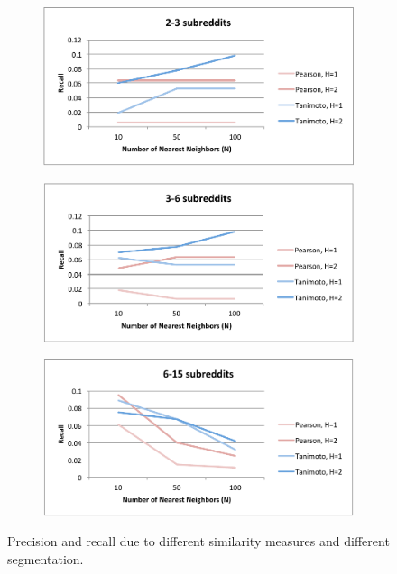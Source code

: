\documentclass{article}
\begin{document}
\begin{figure}[H]
\begin{subfigure}[t]{.47\textwidth}
  \centering
  \includegraphics[width=.9\linewidth]{img/2-3.pdf}
  \label{fig:2-3}
\end{subfigure}
\begin{subfigure}[t]{.47\textwidth}
  \centering
  \includegraphics[width=.9\linewidth]{img/3-6.pdf}
  \label{fig:3-6}
\end{subfigure}
\begin{subfigure}[t]{.47\textwidth}
  \centering
  \includegraphics[width=.9\linewidth]{img/6-15.pdf}
  \label{fig:2-3}
\end{subfigure}
\caption{Precision and recall due to different similarity measures and different segmentation.}\label{fig:learning-and-segments}
\end{figure}
\end{document}

